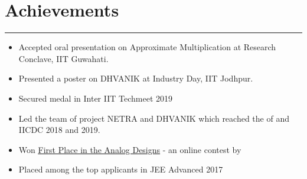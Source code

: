 \documentclass[]{resume}
\begin{document}
\begin{minipage}[t]{0.66\textwidth}
\vspace{-3ex}
\section{Achievements}
\vspace{-0.5em}
\noindent\rule{12.5cm}{0.4pt}

\vspace{-0.7em}
\begin{itemize}
  \item Accepted oral presentation on Approximate Multiplication at Research Conclave, IIT Guwahati.
  \vspace{-0.6em}
  \item Presented a poster on DHVANIK at Industry Day, IIT Jodhpur.  
  \vspace{-0.6em}
  \item Secured  medal in Inter IIT Techmeet 2019 
  \vspace{-0.6em}
  \item Led the team of project NETRA and DHVANIK which reached the  of  and  IICDC 2018 and 2019.
  \vspace{-0.6em}
  \item Won {\href{https://drive.google.com/file/d/1tH7FADsvsnGYCFPdl-HvmgBuhCWdn90d/view}{\underline{First Place in the Analog Designs}}} - an online contest by 
  \vspace{-0.6em}
  \item Placed among the top  applicants in JEE Advanced 2017
\end{itemize}
\end{minipage} 
\end{document}
